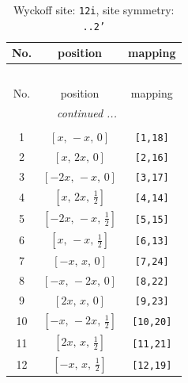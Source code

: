 \documentclass[fleqn,8pt]{jsarticle}
\begin{document}
\begin{longtable}{ccc}
\caption{Wyckoff site: {\tt 12i}, site symmetry: {\tt ..2'}}
 \\
 \hline \hline
No. & position & mapping \\ \hline \endfirsthead

\multicolumn{2}{l}{\tablename\ \thetable{}} \\
 \hline \hline
No. & position & mapping \\ \hline \endhead

 \hline \hline
\multicolumn{2}{r}{\footnotesize\it continued ...} \\ \endfoot

 \hline \hline
\multicolumn{2}{r}{} \\ \endlastfoot

1 & $\left[ x,\, - x,\, 0 \right]$ & {\tt [1,18]} \\ \hline
2 & $\left[ x,\, 2 x,\, 0 \right]$ & {\tt [2,16]} \\ \hline
3 & $\left[ - 2 x,\, - x,\, 0 \right]$ & {\tt [3,17]} \\ \hline
4 & $\left[ x,\, 2 x,\, \frac{1}{2} \right]$ & {\tt [4,14]} \\ \hline
5 & $\left[ - 2 x,\, - x,\, \frac{1}{2} \right]$ & {\tt [5,15]} \\ \hline
6 & $\left[ x,\, - x,\, \frac{1}{2} \right]$ & {\tt [6,13]} \\ \hline
7 & $\left[ - x,\, x,\, 0 \right]$ & {\tt [7,24]} \\ \hline
8 & $\left[ - x,\, - 2 x,\, 0 \right]$ & {\tt [8,22]} \\ \hline
9 & $\left[ 2 x,\, x,\, 0 \right]$ & {\tt [9,23]} \\ \hline
10 & $\left[ - x,\, - 2 x,\, \frac{1}{2} \right]$ & {\tt [10,20]} \\ \hline
11 & $\left[ 2 x,\, x,\, \frac{1}{2} \right]$ & {\tt [11,21]} \\ \hline
12 & $\left[ - x,\, x,\, \frac{1}{2} \right]$ & {\tt [12,19]} \\
\end{longtable}
\renewcommand{\arraystretch}{1.2}
\end{document}
